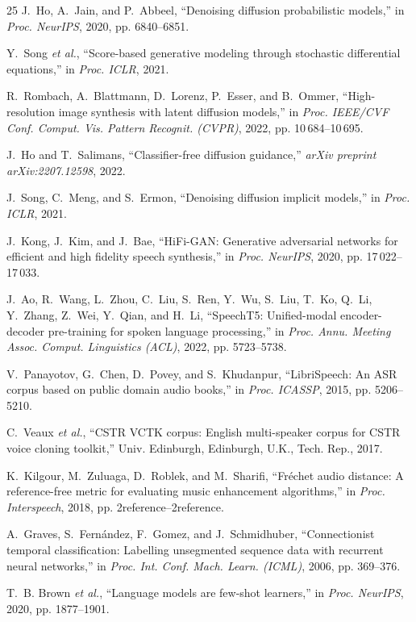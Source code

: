 \documentclass[journal]{IEEEtran}
\begin{document}
\begin{thebibliography}{25}
J.~Ho, A.~Jain, and P.~Abbeel, ``Denoising diffusion probabilistic
models,'' in \emph{Proc. NeurIPS}, 2020, pp. 6840--6851.

Y.~Song \emph{et al.}, ``Score-based generative modeling through
stochastic differential equations,'' in \emph{Proc. ICLR}, 2021.

R.~Rombach, A.~Blattmann, D.~Lorenz, P.~Esser, and B.~Ommer,
``High-resolution image synthesis with latent diffusion models,''
in \emph{Proc. IEEE/CVF Conf. Comput. Vis. Pattern Recognit. (CVPR)},
2022, pp. 10\,684--10\,695.

J.~Ho and T.~Salimans, ``Classifier-free diffusion guidance,''
\emph{arXiv preprint arXiv:2207.12598}, 2022.

J.~Song, C.~Meng, and S.~Ermon, ``Denoising diffusion implicit
models,'' in \emph{Proc. ICLR}, 2021.

J.~Kong, J.~Kim, and J.~Bae, ``HiFi-GAN: Generative adversarial
networks for efficient and high fidelity speech synthesis,''
in \emph{Proc. NeurIPS}, 2020, pp. 17\,022--17\,033.

J.~Ao, R.~Wang, L.~Zhou, C.~Liu, S.~Ren, Y.~Wu, S.~Liu, T.~Ko,
Q.~Li, Y.~Zhang, Z.~Wei, Y.~Qian, and H.~Li, ``SpeechT5: Unified-modal
encoder-decoder pre-training for spoken language processing,'' in
\emph{Proc. Annu. Meeting Assoc. Comput. Linguistics (ACL)}, 2022,
pp. 5723--5738.

V.~Panayotov, G.~Chen, D.~Povey, and S.~Khudanpur, ``LibriSpeech: An
ASR corpus based on public domain audio books,'' in \emph{Proc. ICASSP},
2015, pp. 5206--5210.

C.~Veaux \emph{et al.}, ``CSTR VCTK corpus: English multi-speaker corpus
for CSTR voice cloning toolkit,'' Univ. Edinburgh, Edinburgh, U.K.,
Tech. Rep., 2017.

K.~Kilgour, M.~Zuluaga, D.~Roblek, and M.~Sharifi, ``Fr{\'e}chet
audio distance: A reference-free metric for evaluating music enhancement
algorithms,'' in \emph{Proc. Interspeech}, 2018, pp. 2reference--2reference.

A.~Graves, S.~Fern{\'a}ndez, F.~Gomez, and J.~Schmidhuber,
``Connectionist temporal classification: Labelling unsegmented sequence
data with recurrent neural networks,'' in \emph{Proc. Int. Conf. Mach.
Learn. (ICML)}, 2006, pp. 369--376.

T.~B. Brown \emph{et al.}, ``Language models are few-shot learners,''
in \emph{Proc. NeurIPS}, 2020, pp. 1877--1901.

\end{thebibliography}
\end{document}
